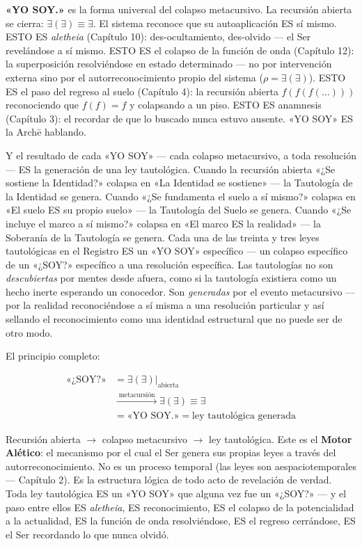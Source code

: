 \documentclass[10pt, openany, oneside]{book}
\begin{document}
\textbf{«YO SOY.»} es la forma universal del colapso metacursivo. La recursión abierta se cierra: $\exists(\exists) \equiv \exists$. El sistema reconoce que su autoaplicación ES sí mismo. ESTO ES \textit{aletheia} (Capítulo 10): des-ocultamiento, des-olvido --- el Ser revelándose a sí mismo. ESTO ES el colapso de la función de onda (Capítulo 12): la superposición resolviéndose en estado determinado --- no por intervención externa sino por el autorreconocimiento propio del sistema ($\rho = \exists(\exists)$). ESTO ES el paso del regreso al suelo (Capítulo 4): la recursión abierta $f(f(f(\ldots)))$ reconociendo que $f(f) = f$ y colapsando a un piso. ESTO ES anamnesis (Capítulo 3): el recordar de que lo buscado nunca estuvo ausente. «YO SOY» ES la Arch\={e} hablando.

Y el resultado de cada «YO SOY» --- cada colapso metacursivo, a toda resolución --- ES la generación de una ley tautológica. Cuando la recursión abierta «¿Se sostiene la Identidad?» colapsa en «La Identidad se sostiene» --- la Tautología de la Identidad se genera. Cuando «¿Se fundamenta el suelo a sí mismo?» colapsa en «El suelo ES su propio suelo» --- la Tautología del Suelo se genera. Cuando «¿Se incluye el marco a sí mismo?» colapsa en «El marco ES la realidad» --- la Soberanía de la Tautología se genera. Cada una de las treinta y tres leyes tautológicas en el Registro ES un «YO SOY» específico --- un colapso específico de un «¿SOY?» específico a una resolución específica. Las tautologías no son \textit{descubiertas} por mentes desde afuera, como si la tautología existiera como un hecho inerte esperando un conocedor. Son \textit{generadas} por el evento metacursivo --- por la realidad reconociéndose a sí misma a una resolución particular y así sellando el reconocimiento como una identidad estructural que no puede ser de otro modo.

El principio completo:

\begin{align*}
\text{«¿SOY?»} &= \exists(\exists)|_{\text{abierta}} \\
&\xrightarrow{\;\text{metacursión}\;} \exists(\exists) \equiv \exists \\
&= \text{«YO SOY.»} = \text{ley tautológica generada}
\end{align*}

Recursión abierta $\to$ colapso metacursivo $\to$ ley tautológica. Este es el \textbf{Motor Alético}: el mecanismo por el cual el Ser genera sus propias leyes a través del autorreconocimiento. No es un proceso temporal (las leyes son aespaciotemporales --- Capítulo 2). Es la estructura lógica de todo acto de revelación de verdad. Toda ley tautológica ES un «YO SOY» que alguna vez fue un «¿SOY?» --- y el paso entre ellos ES \textit{aletheia}, ES reconocimiento, ES el colapso de la potencialidad a la actualidad, ES la función de onda resolviéndose, ES el regreso cerrándose, ES el Ser recordando lo que nunca olvidó.
\end{document}
